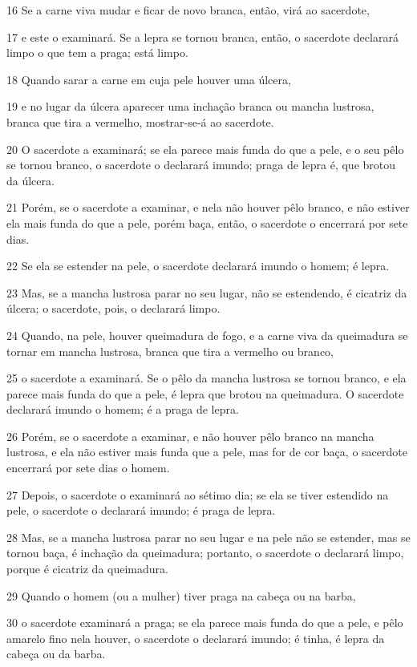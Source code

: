 \par 16 Se a carne viva mudar e ficar de novo branca, então, virá ao sacerdote,
\par 17 e este o examinará. Se a lepra se tornou branca, então, o sacerdote declarará limpo o que tem a praga; está limpo.
\par 18 Quando sarar a carne em cuja pele houver uma úlcera,
\par 19 e no lugar da úlcera aparecer uma inchação branca ou mancha lustrosa, branca que tira a vermelho, mostrar-se-á ao sacerdote.
\par 20 O sacerdote a examinará; se ela parece mais funda do que a pele, e o seu pêlo se tornou branco, o sacerdote o declarará imundo; praga de lepra é, que brotou da úlcera.
\par 21 Porém, se o sacerdote a examinar, e nela não houver pêlo branco, e não estiver ela mais funda do que a pele, porém baça, então, o sacerdote o encerrará por sete dias.
\par 22 Se ela se estender na pele, o sacerdote declarará imundo o homem; é lepra.
\par 23 Mas, se a mancha lustrosa parar no seu lugar, não se estendendo, é cicatriz da úlcera; o sacerdote, pois, o declarará limpo.
\par 24 Quando, na pele, houver queimadura de fogo, e a carne viva da queimadura se tornar em mancha lustrosa, branca que tira a vermelho ou branco,
\par 25 o sacerdote a examinará. Se o pêlo da mancha lustrosa se tornou branco, e ela parece mais funda do que a pele, é lepra que brotou na queimadura. O sacerdote declarará imundo o homem; é a praga de lepra.
\par 26 Porém, se o sacerdote a examinar, e não houver pêlo branco na mancha lustrosa, e ela não estiver mais funda que a pele, mas for de cor baça, o sacerdote encerrará por sete dias o homem.
\par 27 Depois, o sacerdote o examinará ao sétimo dia; se ela se tiver estendido na pele, o sacerdote o declarará imundo; é praga de lepra.
\par 28 Mas, se a mancha lustrosa parar no seu lugar e na pele não se estender, mas se tornou baça, é inchação da queimadura; portanto, o sacerdote o declarará limpo, porque é cicatriz da queimadura.
\par 29 Quando o homem (ou a mulher) tiver praga na cabeça ou na barba,
\par 30 o sacerdote examinará a praga; se ela parece mais funda do que a pele, e pêlo amarelo fino nela houver, o sacerdote o declarará imundo; é tinha, é lepra da cabeça ou da barba.
